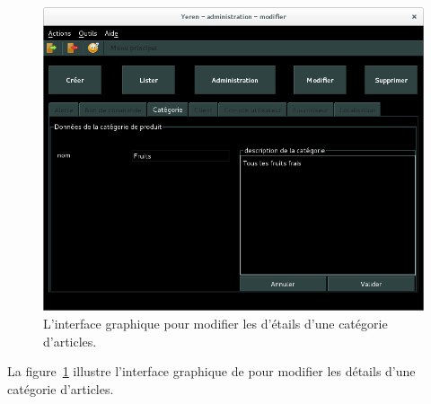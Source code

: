 
\newpage
{}

\begin{figure}[!htpb]
	\centering
	\includegraphics[scale=0.45]{images/categorie-articles-modifier.png}
	\caption{L'interface graphique pour modifier les d'\'etails
			d'une cat\'egorie d'articles.}
	\label{fig:admin-categories-articles-modifier}
\end{figure}

La figure~\ref{fig:admin-categories-articles-modifier}
illustre l'interface graphique de \yeren pour modifier
les d\'etails d'une cat\'egorie d'articles.

